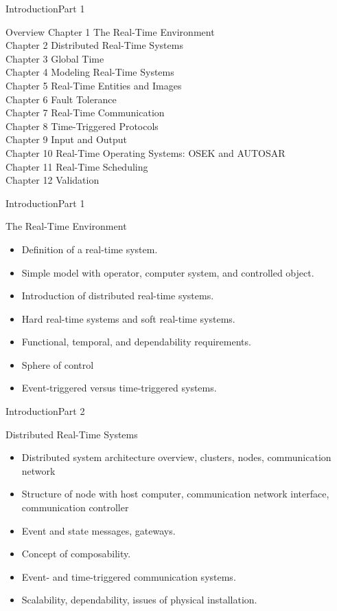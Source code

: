 \begin{frame}{Introduction}{Part 1}
    \begin{block}{Overview}
Chapter 1	  The Real-Time Environment\\
Chapter 2	  Distributed Real-Time Systems\\
Chapter 3	  Global Time\\
Chapter 4	  Modeling Real-Time Systems\\
Chapter 5	  Real-Time Entities and Images\\
Chapter 6	  Fault Tolerance\\
Chapter 7	  Real-Time Communication\\
Chapter 8	  Time-Triggered Protocols\\
Chapter 9	  Input and Output\\
Chapter 10	Real-Time Operating Systems: OSEK and AUTOSAR\\
Chapter 11	Real-Time Scheduling\\
Chapter 12	Validation
\end{block}
\end{frame}


\begin{frame}{Introduction}{Part 1}
    \begin{block}{The Real-Time Environment}
\begin{itemize}
\item
  Definition of a real-time system.
\item
  Simple model with operator, computer system, and controlled object.
\item
  Introduction of distributed real-time systems.
\item
  Hard real-time systems and soft real-time systems.
\item
  Functional, temporal, and dependability requirements.
\item
  Sphere of control
\item
  Event-triggered versus time-triggered systems.
\end{itemize}
\end{block}
\end{frame}

\begin{frame}{Introduction}{Part 2}
    \begin{block}{Distributed Real-Time Systems}
\begin{itemize}
\item
  Distributed system architecture overview, clusters, nodes,
  communication network
\item
  Structure of node with host computer, communication network interface,
  communication controller
\item
  Event and state messages, gateways.
\item
  Concept of composability.
\item
  Event- and time-triggered communication systems.
\item
  Scalability, dependability, issues of physical installation.
\end{itemize}
\end{block}
\end{frame}


